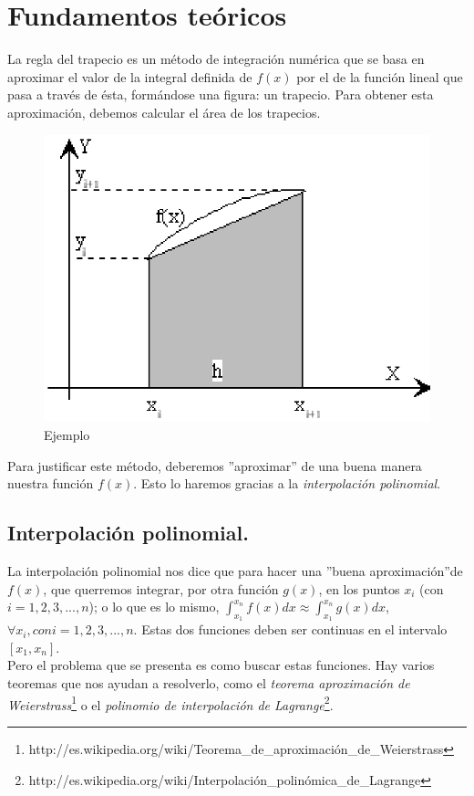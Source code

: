 \documentclass{article}
\begin{document}

  \section{Fundamentos teóricos}
    La regla del trapecio es un método de integración numérica que se basa en aproximar el valor de la integral definida de $f(x)$ por el de la función lineal que pasa a través de ésta, formándose una figura: un trapecio. Para obtener esta aproximación, debemos calcular el área de los trapecios.
    
    \begin{figure}[h]
      \begin{center}
	\includegraphics[scale=0.5]{areadeltrapecio.eps}
	\caption{Ejemplo}
      \end{center}
    \end{figure}

      Para justificar este método, deberemos ''aproximar'' de una buena manera nuestra función $f(x)$. Esto lo haremos gracias a la \textit{interpolación polinomial}.

    \subsection{Interpolación polinomial.}
      La interpolación polinomial nos dice que para hacer una ''buena aproximación''de $f(x)$, que querremos integrar, por otra función $g(x)$, en los puntos $x_{i}$ (con $i = 1, 2, 3, ..., n$); o lo que es lo mismo, $\int_{x_{1}}^{x_{n}}f(x)dx \approx \int_{x_{1}}^{x_{n}}g(x)dx$, $\forall x_{i}, con i = 1, 2, 3, ..., n$. Estas dos funciones deben ser continuas en el intervalo $[x_{1}, x_{n}]$.\\
      Pero el problema que se presenta es como buscar estas funciones. Hay varios teoremas que nos ayudan a resolverlo, como el \textit{teorema aproximación de Weierstrass}\footnote{http://es.wikipedia.org/wiki/Teorema\_de\_aproximación\_de\_Weierstrass} o el \textit{polinomio de interpolación de Lagrange}\footnote{http://es.wikipedia.org/wiki/Interpolación\_polinómica\_de\_Lagrange}.
      
\end{document}
